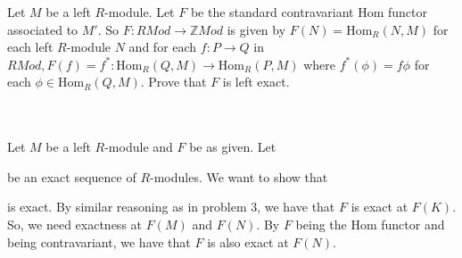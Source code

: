 Let $M$ be a left $R$-module. Let $F$ be the standard contravariant Hom functor associated to $M'$. So
$F:RMod\to \mathbb{Z}Mod$ is given by $F(N)=\text{Hom}_R(N,M)$ for each left $R$-module $N$ and for each
$f:P\to Q$ in $RMod, F(f)=f^*:\text{Hom}_R(Q,M)\to\text{Hom}_R(P,M)$ where $f^*(\phi)=f\phi$ for each
$\phi\in\text{Hom}_R(Q,M)$. Prove that $F$ is left exact.\\\\

\begin{solution}\renewcommand{\qedsymbol}{}\ \\

    Let $M$ be a left $R$-module and $F$ be as given. Let

    \begin{center}
    \end{center}

    be an exact sequence of $R$-modules. We want to show that

    \begin{center}
    \end{center}

    is exact. By similar reasoning as in problem 3, we have that $F$ is exact at $F(K)$. So, we need
    exactness at $F(M)$ and $F(N)$. By $F$ being the $\text{Hom}$ functor and being contravariant, we
    have that $F$ is also exact at $F(N)$.


\end{solution}
